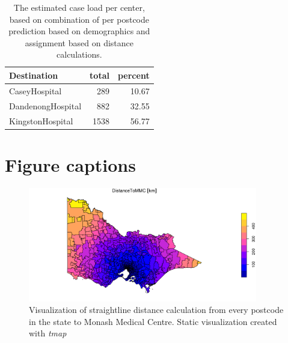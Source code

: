 \documentclass[utf8]{frontiersHLTH}
\begin{document}
\begin{table}[h]
\begin{tabular}{l|r|r}
\hline
Destination & total & percent\\
\hline
CaseyHospital & 289 & 10.67\\
\hline
DandenongHospital & 882 & 32.55\\
\hline
KingstonHospital & 1538 & 56.77\\
\hline
\end{tabular}
\caption{The estimated case load per center, based on combination of per postcode prediction based on demographics and assignment based on distance calculations.\label{tab:rehabcaselaod}}
\end{table}

\section*{Figure captions}

\begin{figure}[h!]
\begin{center}
\includegraphics[width=10cm]{distance_mmc.png}
\end{center}
\caption{Visualization of straightline distance calculation from every postcode in the state to Monash Medical Centre. Static visualization created with {\em tmap}}\label{fig:DistanceToMMC}
\end{figure}
\end{document}
